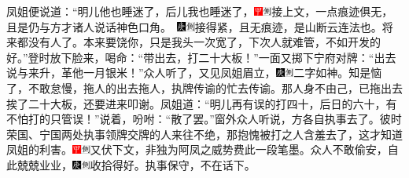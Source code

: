凤姐便说道：“明儿他也睡迷了，后儿我也睡迷了，{\includegraphics[width=3mm]{../Images/00002}\includegraphics[width=3mm]{../Images/00011}\footnotesize \kaishu 接上文，一点痕迹俱无，且是仍与方才诸人说话神色口角。　\includegraphics[width=3mm]{../Images/00004}\includegraphics[width=3mm]{../Images/00011}\footnotesize \kaishu 接得紧，且无痕迹，是山断云连法也。}将来都没有人了。本来要饶你，只是我头一次宽了，下次人就难管，不如开发的好。”登时放下脸来，喝命：“带出去，打二十大板！”一面又掷下宁府对牌：“出去说与来升，革他一月银米！”众人听了，又见凤姐眉立，{\includegraphics[width=3mm]{../Images/00004}\includegraphics[width=3mm]{../Images/00011}\footnotesize \kaishu 二字如神。}知是恼了，不敢怠慢，拖人的出去拖人，执牌传谕的忙去传谕。那人身不由己，已拖出去挨了二十大板，还要进来叩谢。凤姐道：“明儿再有误的打四十，后日的六十，有不怕打的只管误！”说着，吩咐：“散了罢。”窗外众人听说，方各自执事去了。彼时荣国、宁国两处执事领牌交牌的人来往不绝，那抱愧被打之人含羞去了，这才知道凤姐的利害。{\includegraphics[width=3mm]{../Images/00002}\includegraphics[width=3mm]{../Images/00011}\footnotesize \kaishu 又伏下文，非独为阿凤之威势费此一段笔墨。}众人不敢偷安，自此兢兢业业，{\includegraphics[width=3mm]{../Images/00004}\includegraphics[width=3mm]{../Images/00011}\footnotesize \kaishu 收拾得好。}执事保守，不在话下。

